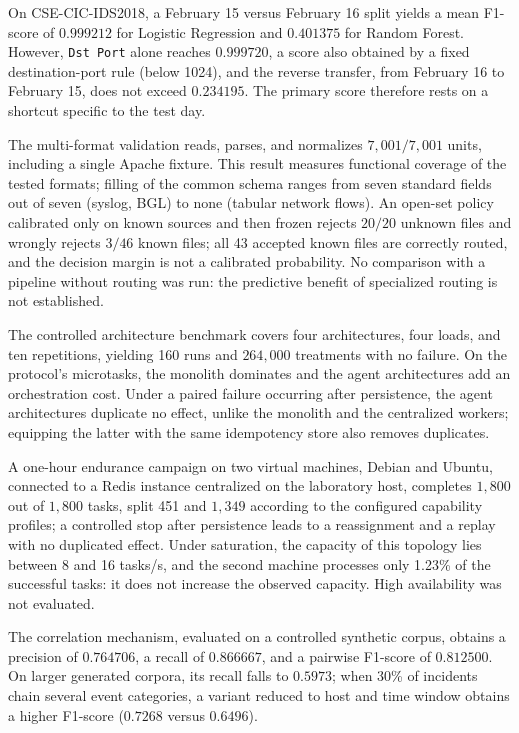 On CSE-CIC-IDS2018, a February 15 versus February 16 split yields a mean
F1-score of $0.999212$ for Logistic Regression and $0.401375$ for Random
Forest. However, \texttt{Dst Port} alone reaches $0.999720$, a score also
obtained by a fixed destination-port rule (below 1024), and the reverse
transfer, from February 16 to February 15, does not exceed $0.234195$. The
primary score therefore rests on a shortcut specific to the test day.

The multi-format validation reads, parses, and normalizes $7{,}001/7{,}001$
units, including a single Apache fixture. This result measures functional
coverage of the tested formats; filling of the common schema ranges from seven
standard fields out of seven (syslog, BGL) to none (tabular network flows). An
open-set policy calibrated only on known sources and then frozen rejects
$20/20$ unknown files and wrongly rejects $3/46$ known files; all 43 accepted
known files are correctly routed, and the decision margin is not a calibrated
probability. No comparison with a pipeline without routing was run: the
predictive benefit of specialized routing is not established.

The controlled architecture benchmark covers four architectures, four loads,
and ten repetitions, yielding 160 runs and $264{,}000$ treatments with no
failure. On the protocol's microtasks, the monolith dominates and the agent
architectures add an orchestration cost. Under a paired failure occurring
after persistence, the agent architectures duplicate no effect, unlike the
monolith and the centralized workers; equipping the latter with the same
idempotency store also removes duplicates.

A one-hour endurance campaign on two virtual machines, Debian and Ubuntu,
connected to a Redis instance centralized on the laboratory host, completes
$1{,}800$ out of $1{,}800$ tasks, split 451 and $1{,}349$ according to the
configured capability profiles; a controlled stop after persistence leads to
a reassignment and a replay with no duplicated effect. Under saturation, the
capacity of this topology lies between 8 and 16 tasks/s, and the second
machine processes only 1.23\% of the successful tasks: it does not increase
the observed capacity. High availability was not evaluated.

The correlation mechanism, evaluated on a controlled synthetic corpus,
obtains a precision of $0.764706$, a recall of $0.866667$, and a pairwise
F1-score of $0.812500$. On larger generated corpora, its recall falls to
$0.5973$; when 30\% of incidents chain several event categories, a variant
reduced to host and time window obtains a higher F1-score ($0.7268$ versus
$0.6496$).

